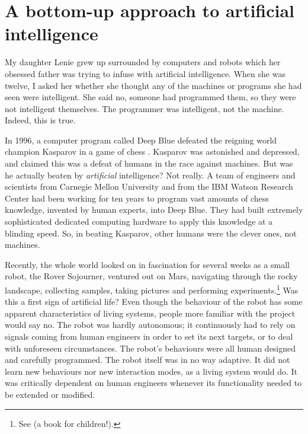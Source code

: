 \section{A bottom-up approach to artificial intelligence}

 My daughter Lenie grew up surrounded by computers and 
robots which her obsessed father was trying to infuse
with artificial intelligence. When she was twelve, I asked
her whether she thought any of the machines or 
programs she had seen were intelligent. 
She said no, someone had programmed them, so they were
not intelligent themselves. The programmer was 
intelligent, not the machine. Indeed, this is true. 

In 1996, a computer program called Deep Blue
defeated the reigning world champion Kasparov in a game of 
chess \citep{Newborn:1996}.
Kasparov was astonished
and depressed, and claimed this was a defeat of humans in 
the 
race against machines. But was he actually beaten by {\itshape artificial}
intelligence? Not really. A team of engineers and scientists
from Carnegie Mellon University and from the IBM Watson 
Research Center had been working for ten years to program 
vast amounts of chess knowledge, invented by
human experts, into Deep Blue. They had built extremely 
sophisticated dedicated computing hardware to
apply this knowledge at a blinding speed. So, in beating Kasparov, 
other humans were the clever ones, not machines. 

Recently, the whole world looked on in fascination
for several weeks as a small robot, the Rover Sojourner, ventured
out on Mars, navigating through the rocky landscape, collecting
samples, taking pictures and performing 
experiments.\footnote{
See \cite{Wunsch:1998} (a book for children!).}
Was this a first sign of artificial life? Even though the 
behaviour of the robot has some apparent characteristics
of living systems, people more
familiar with the project would say no. 
The robot was hardly autonomous; it continuously had to rely
on signals coming from human engineers in order to set
its next targets, or to deal with unforeseen circumstances. 
The robot's behaviours were
all human designed and carefully programmed. The robot 
itself was in no way adaptive. It did not learn new behaviours
nor new interaction modes, as a living system would do.
It was critically dependent on human engineers whenever its
functionality needed to be extended or modified. 

